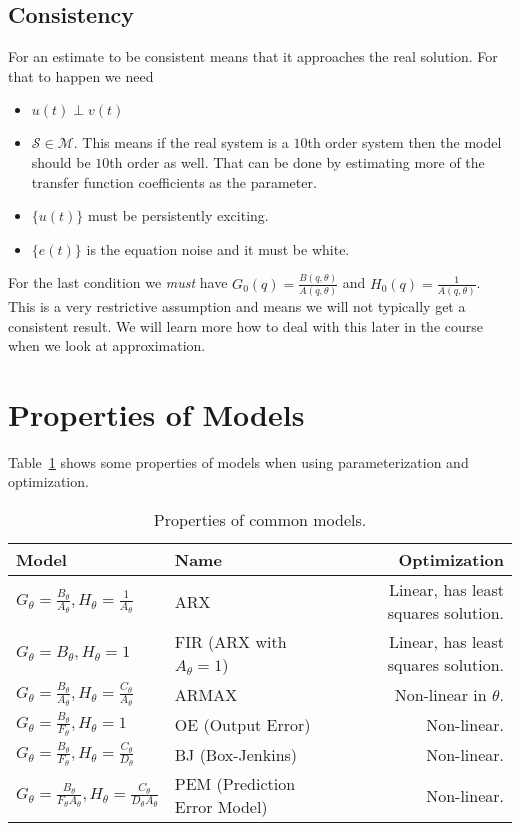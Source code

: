\subsection{Consistency}
For an estimate to be consistent means that it approaches the real solution.
For that to happen we need
\begin{itemize}
\item $u(t)\perp v(t)$
\item $\mathcal{S}\in\mathcal{M}$.
This means if the real system is a $10$th order system then the model should be $10$th order as well.
That can be done by estimating more of the transfer function coefficients as the parameter.
\item $\{u(t)\}$ must be persistently exciting.
\item $\{e(t)\}$ is the equation noise and it must be white.
\end{itemize}
For the last condition we \textit{must} have $G_0(q)=\frac{B(q,\theta)}{A(q,\theta)}$ and $H_0(q)=\frac{1}{A(q,\theta)}$.
This is a very restrictive assumption and means we will not typically get a consistent result.
We will learn more how to deal with this later in the course when we look at approximation.

\section{Properties of Models}
Table~\ref{tab:models} shows some properties of models when using parameterization and optimization.

\begin{table}[ht!]
\caption{Properties of common models.}
\small
\centering
\begin{tabular}{@{}llr@{}}
\toprule
Model & Name & Optimization \\
\midrule
$G_\theta=\frac{B_\theta}{A_\theta}, H_\theta=\frac{1}{A_\theta}$ & ARX & Linear, has least squares solution. \\
$G_\theta=B_\theta, H_\theta=1$ & FIR (ARX with $A_\theta=1$) & Linear, has least squares solution. \\
$G_\theta=\frac{B_\theta}{A_\theta}, H_\theta=\frac{C_\theta}{A_\theta}$ & ARMAX & Non-linear in $\theta$. \\
$G_\theta=\frac{B_\theta}{F_\theta}, H_\theta=1$ & OE (Output Error) & Non-linear. \\
$G_\theta=\frac{B_\theta}{F_\theta}, H_\theta=\frac{C_\theta}{D_\theta}$ & BJ (Box-Jenkins) & Non-linear. \\
$G_\theta=\frac{B_\theta}{F_\theta A_\theta}, H_\theta=\frac{C_\theta}{D_\theta A_\theta}$ & PEM (Prediction Error Model) & Non-linear. \\
\bottomrule
\end{tabular}%
\label{tab:models}
\end{table}

